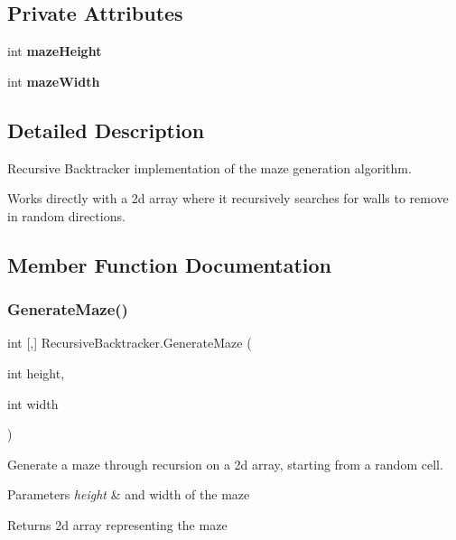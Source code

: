 \subsection*{Private Attributes}
\begin{DoxyCompactItemize}
\item 
\mbox{\label{class_recursive_backtracker_aca51883f95cfe740ef45bd1cdf0c1904}} 
int {\bfseries maze\+Height}
\item 
\mbox{\label{class_recursive_backtracker_aa5bc7747f36ca5904c94843c163040f0}} 
int {\bfseries maze\+Width}
\end{DoxyCompactItemize}


\subsection{Detailed Description}
Recursive Backtracker implementation of the maze generation algorithm. 

Works directly with a 2d array where it recursively searches for walls to remove in random directions. 

\subsection{Member Function Documentation}
\mbox{\label{class_recursive_backtracker_aad90aef96d152cffe30e82cf2d25a249}} 
\subsubsection{\texorpdfstring{GenerateMaze()}{GenerateMaze()}}
{\footnotesize\ttfamily int \mbox{[},\mbox{]} Recursive\+Backtracker.\+Generate\+Maze (\begin{DoxyParamCaption}\item[{int}]{height,  }\item[{int}]{width }\end{DoxyParamCaption})}



Generate a maze through recursion on a 2d array, starting from a random cell. 


\begin{DoxyParams}{Parameters}
{\em height} & and width of the maze\\
\hline
\end{DoxyParams}
\begin{DoxyReturn}{Returns}
2d array representing the maze 
\end{DoxyReturn}
\mbox{\label{class_recursive_backtracker_a6c674f12c0bfe5b443c1d52b15beb311}} 
